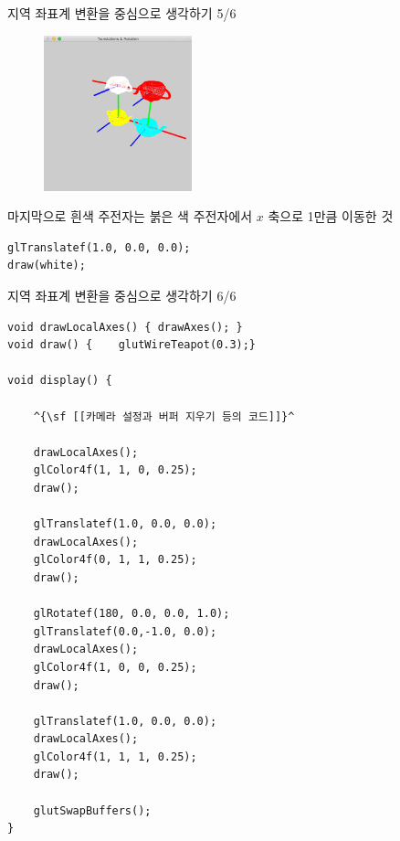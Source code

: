 \documentclass{beamer}
\begin{document}
\begin{frame}[fragile]{지역 좌표계 변환을 중심으로 생각하기 5/6}

\begin{figure}
    \includegraphics[height=4.5cm]{OGL_transform/localCoordXform.png}
\end{figure}

마지막으로 흰색 주전자는 붉은 색 주전자에서 $x$ 축으로 1만큼 이동한 것

\begin{verbatim}
glTranslatef(1.0, 0.0, 0.0);
draw(white);
\end{verbatim}

\end{frame}

\begin{frame}[fragile]{지역 좌표계 변환을 중심으로 생각하기 6/6}

\lstset{language=C++, escapechar=^} 
\begin{lstlisting}
void drawLocalAxes() { drawAxes(); }
void draw() {    glutWireTeapot(0.3);}

void display() {

    ^{\sf [[카메라 설정과 버퍼 지우기 등의 코드]]}^

    drawLocalAxes();
    glColor4f(1, 1, 0, 0.25);
    draw();
    
    glTranslatef(1.0, 0.0, 0.0);
    drawLocalAxes();
    glColor4f(0, 1, 1, 0.25);
    draw();
    
    glRotatef(180, 0.0, 0.0, 1.0);
    glTranslatef(0.0,-1.0, 0.0);
    drawLocalAxes();
    glColor4f(1, 0, 0, 0.25);
    draw();
    
    glTranslatef(1.0, 0.0, 0.0);
    drawLocalAxes();
    glColor4f(1, 1, 1, 0.25);
    draw();
    
    glutSwapBuffers();
}

\end{lstlisting}

\end{frame}
\end{document}
